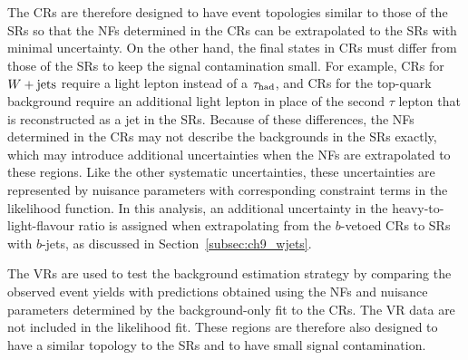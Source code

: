 The CRs are therefore designed to have event topologies similar to those of the SRs so that the NFs determined in the CRs can be extrapolated to the SRs with minimal uncertainty.
On the other hand, the final states in CRs must differ from those of the SRs to keep the signal contamination small.
For example, CRs for $W+\mathrm{jets}$ require a light lepton instead of a $\tau_{\mathrm{had}}$, and CRs for the top-quark background require an additional light lepton in place of the second $\tau$ lepton that is reconstructed as a jet in the SRs.
Because of these differences, the NFs determined in the CRs may not describe the backgrounds in the SRs exactly, which may introduce additional uncertainties when the NFs are extrapolated to these regions.
Like the other systematic uncertainties, these uncertainties are represented by nuisance parameters with corresponding constraint terms in the likelihood function.
In this analysis, an additional uncertainty in the heavy-to-light-flavour ratio is assigned when extrapolating from the $b$-vetoed CRs to SRs with $b$-jets, as discussed in Section~\ref{subsec:ch9_wjets}.

The VRs are used to test the background estimation strategy by comparing the observed event yields with predictions obtained using the NFs and nuisance parameters determined by the background-only fit to the CRs.
The VR data are not included in the likelihood fit.
These regions are therefore also designed to have a similar topology to the SRs and to have small signal contamination.

